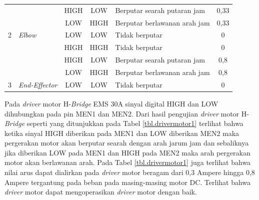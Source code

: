 \begin{longtable}{|c|l|c|c|l|c|}
	&                                                                      & HIGH                         & LOW                          & Berputar searah putaran jam                                            & 0,33                                                \\ \cline{3-6} 
	&                                                                      & LOW                          & HIGH                         & Berputar berlawanan arah jam                                           & 0,33                                                \\ \cline{3-6} 
	\multirow{-4}{*}{2}                          & \multirow{-4}{*}{\textit{Elbow}}                                              & LOW                          & LOW                          & Tidak berputar                                                         & 0                                                   \\ \hline
	&                                                                      & HIGH                         & HIGH                         & Tidak berputar                                                         & 0                                                   \\ \cline{3-6} 
	&                                                                      & HIGH                         & LOW                          & Berputar searah putaran jam                                            & 0,8                                                 \\ \cline{3-6} 
	&                                                                      & LOW                          & HIGH                         & Berputar berlawanan arah jam                                           & 0,8                                                 \\ \cline{3-6} 
	\multirow{-4}{*}{3}                          & \multirow{-4}{*}{\textit{End-Effector}}                                       & LOW                          & LOW                          & Tidak berputar                                                         & 0                                                   \\ \hline
\end{longtable}
Pada \textit{driver} motor H-\textit{Bridge} EMS 30A sinyal digital HIGH dan LOW dihubungkan pada pin MEN1 dan MEN2. Dari hasil pengujian \textit{driver} motor H-\textit{Bridge} seperti yang ditunjukkan pada Tabel \ref{tbl.drivermotor1} terlihat bahwa ketika sinyal HIGH diberikan pada MEN1 dan LOW diberikan MEN2 maka pergerakan motor akan berputar searah dengan arah jarum jam dan sebaliknya jika diberikan LOW pada MEN1 dan HIGH pada MEN2 maka arah pergerakan motor akan berlawanan arah. Pada Tabel \ref{tbl.drivermotor1} juga terlihat bahwa nilai arus dapat dialirkan pada \textit{driver} motor beragam dari 0,3 Ampere hingga 0,8 Ampere tergantung pada beban pada masing-masing motor DC. Terlihat bahwa \textit{driver} motor dapat mengoperasikan \textit{driver} motor dengan baik.

